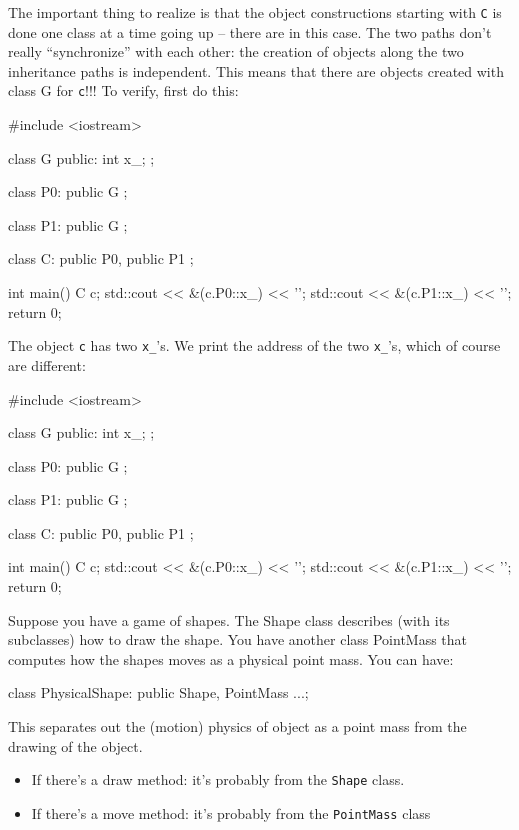 The important thing to realize is that the object constructions starting
with \verb!C! is done one class at a time going up -- there are
 in this case. The two paths don't really
``synchronize'' with each other: the creation of objects along the two
inheritance paths is independent. This means that there are 
objects created with class G for \verb!c!!!!
To verify, first do this:
\begin{console}
#include <iostream>

class G
{
public:
        int x_;
};

class P0: public G
{};

class P1: public G
{};

class C: public P0, public P1
{};

int main()
{   
    C c;
    std::cout << &(c.P0::x_) << '\n';
    std::cout << &(c.P1::x_) << '\n';
    return 0;
}
\end{console}
The object \verb!c! has two \verb!x_!'s. We print the address of the
two \verb!x_!'s, which of course are different:
\begin{console}
#include <iostream>

class G
{
public:
        int x_;
};

class P0: public G
{};

class P1: public G
{};

class C: public P0, public P1
{};

int main()
{   
    C c;
    std::cout << &(c.P0::x_) << '\n';
    std::cout << &(c.P1::x_) << '\n';
    return 0;
}
\end{console}

Suppose you have a game of shapes. The Shape class describes (with its
subclasses) how to draw the shape. You have another class PointMass that
computes how the shapes moves as a physical point mass. You can have:
\begin{console}
class PhysicalShape: public Shape, PointMass
{...};
\end{console}

This separates out the (motion) physics of object as a point mass from
the drawing of the object.

\begin{itemize}
\item
  If there's a draw method: it's
  probably from the \verb!Shape! class.
\item
  If there's a move method: it's
  probably from the \verb!PointMass! class
\end{itemize}

